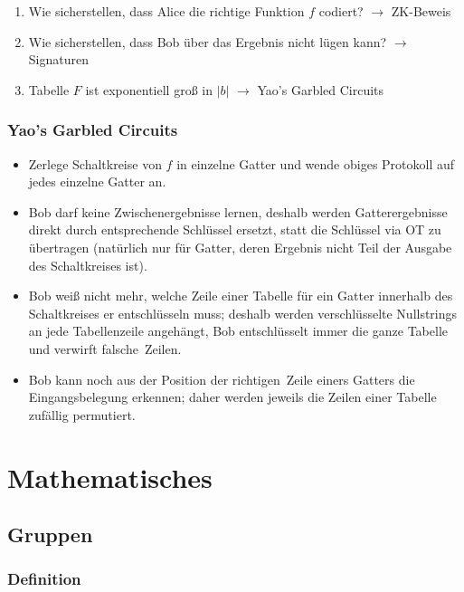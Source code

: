 \documentclass[a4paper,twoside,DIV15,BCOR12mm]{scrbook}
\begin{document}
\begin{enumerate}
	\item Wie sicherstellen, dass Alice die richtige Funktion $f$ codiert? $\rightarrow$ ZK-Beweis
	\item Wie sicherstellen, dass Bob über das Ergebnis nicht lügen kann? $\rightarrow$ Signaturen
	\item Tabelle $F$ ist exponentiell groß in $\left|b\right|$ $\rightarrow$ \glqq Yao's Garbled Circuits\grqq
\end{enumerate}

\subsection{Yao's Garbled Circuits}

\begin{itemize}
	\item Zerlege Schaltkreise von $f$ in einzelne Gatter und wende obiges Protokoll auf jedes einzelne Gatter an.
	\item Bob darf keine Zwischenergebnisse lernen, deshalb werden Gatterergebnisse direkt durch entsprechende Schlüssel ersetzt, statt die Schlüssel via OT zu übertragen (natürlich nur für Gatter, deren Ergebnis nicht Teil der Ausgabe des Schaltkreises ist).
	\item Bob weiß nicht mehr, welche Zeile einer Tabelle für ein Gatter innerhalb des Schaltkreises er entschlüsseln muss; deshalb werden verschlüsselte Nullstrings an jede Tabellenzeile angehängt, Bob entschlüsselt immer die ganze Tabelle und verwirft \glqq falsche\grqq\ Zeilen.
	\item Bob kann noch aus der Position der \glqq richtigen\grqq\ Zeile einers Gatters die Eingangsbelegung erkennen; daher werden jeweils die Zeilen einer Tabelle zufällig permutiert.
\end{itemize}
		

\chapter{Mathematisches} \label{mathe}

\section{Gruppen}

\subsection{Definition}
\end{document}
